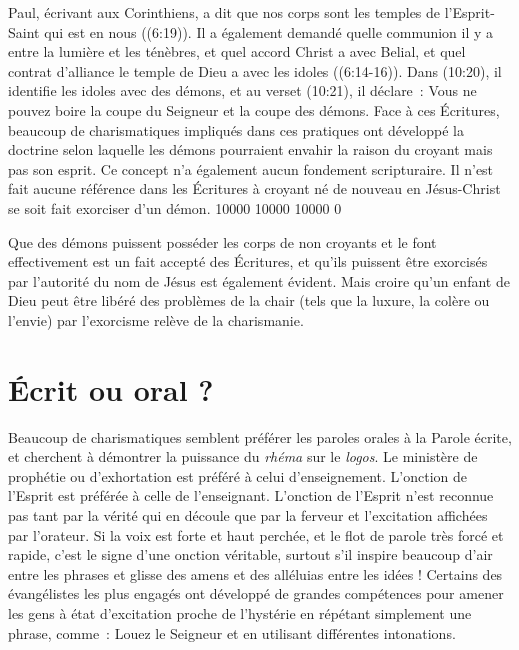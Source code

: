 \begin{specialpar}{}
Paul, écrivant aux Corinthiens, a dit que nos corps sont les temples
 de l'Esprit-Saint qui est en nous ((6:19)).
 Il a également demandé quelle communion il y a entre la lumière
 et les ténèbres, et quel accord Christ a avec Belial,
 et quel contrat d'alliance le temple de Dieu a avec les idoles
 ((6:14-16)). Dans (10:20),
 il identifie les idoles avec des démons, et au verset (10:21),
 il déclare~: \og Vous ne pouvez boire la coupe du Seigneur
 et la coupe des démons. \fg{} Face à ces Écritures,
 beaucoup de charismatiques impliqués dans ces pratiques
 ont développé la doctrine selon laquelle les démons pourraient envahir
 la raison du croyant mais pas son esprit.
 Ce concept n'a également aucun fondement scripturaire.
 Il n'est fait aucune référence dans les Écritures à croyant né de nouveau
 en Jésus-Christ se soit fait exorciser d'un démon.
 \begingroup{} 10000 10000 10000 0
 \par\endgroup
\end{specialpar}

Que des démons puissent posséder les corps de non croyants
 et le font effectivement est un fait accepté des Écritures,
 et qu'ils puissent être exorcisés par l'autorité du nom de Jésus
 est également évident. Mais croire qu'un enfant de Dieu peut être libéré
 des problèmes de la chair (tels que la luxure, la colère ou l'envie)
 par l'exorcisme relève de la charismanie.


\section*{Écrit ou oral ?}

Beaucoup de charismatiques semblent préférer les paroles orales
 à la Parole écrite, et cherchent à démontrer la puissance
 du \emph{rhéma} sur le \emph{logos}.
 Le ministère de prophétie ou d'exhortation
 est préféré à celui d'enseignement. L'onction de l'Esprit est préférée
 à celle de l'enseignant. L'onction de l'Esprit n'est reconnue
 pas tant par la vérité qui en découle que par la ferveur
 et l'excitation affichées par l'orateur. Si la voix est forte
 et haut perchée, et le flot de parole très forcé et rapide,
 c'est le signe d'une onction véritable, surtout s'il inspire beaucoup
 d'air entre les phrases et glisse des amens et des alléluias
 entre les idées ! Certains des évangélistes les plus engagés
 ont développé de grandes compétences pour amener les gens
 à état d'excitation proche de l'hystérie en répétant simplement
 une phrase, comme~: \og Louez le Seigneur \fg{} et en utilisant différentes
 intonations.

